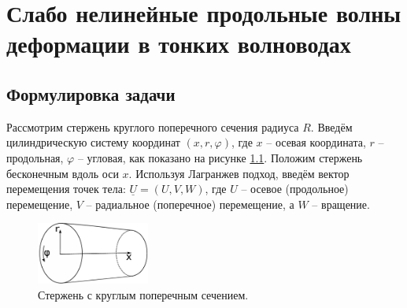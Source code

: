\documentclass[12pt, a4paper]{report}
\newcommand{\vect}[1]{\underline{#1}}
\begin{document}
\chapter{Слабо нелинейные продольные волны деформации в тонких волноводах}

\section{Формулировка задачи}


Рассмотрим стержень круглого поперечного сечения радиуса $R$. Введём цилиндрическую систему координат $(x, r, \varphi)$, где $x$ -- осевая координата, $r$ -- продольная, $\varphi$ -- угловая, как показано на рисунке \ref{fig:rod}. Положим стержень бесконечным вдоль оси $x$. Используя Лагранжев подход, введём вектор перемещения точек тела: $\vect{U} = (U, V, W)$, где $U$ -- осевое (продольное) перемещение, $V$ -- радиальное (поперечное) перемещение, а $W$ -- вращение.
\begin{figure}[h]
	\centering
	\includegraphics[width=0.33\textwidth]{1_RodSchematic}
	\caption{Стержень с круглым поперечным сечением.}
	\label{fig:rod}
\end{figure}
\end{document}
